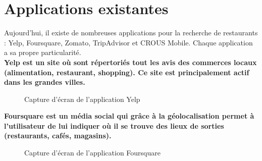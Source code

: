 
\section{Applications existantes}

Aujourd'hui, il existe de nombreuses applications pour la recherche de restaurants : Yelp, Foursquare, Zomato, TripAdvisor et CROUS Mobile. Chaque application a sa propre particularité. \\

\bf{Yelp} est un site où sont répertoriés tout les avis des commerces locaux (alimentation, restaurant, shopping). Ce site est principalement actif dans les grandes villes.

\begin{figure}[H]
    \label{fig-yelp}
    \noindent{}
    \caption{Capture d'écran de l'application Yelp}
\end{figure}

\bf{Foursquare} est un média social qui grâce à la géolocalisation permet à l'utilisateur de lui indiquer où il se trouve des lieux de sorties (restaurants, cafés, magasins).

\begin{figure}[H]
    \label{fig-foursquare}
    \noindent{}
    \caption{Capture d'écran de l'application Foursquare}
\end{figure}

